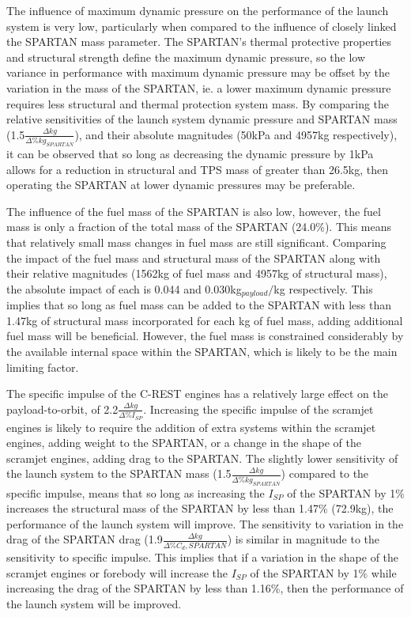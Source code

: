 The influence of maximum dynamic pressure on the performance of the launch system is very low, particularly when compared to the influence of closely linked the SPARTAN mass parameter. The SPARTAN's thermal protective properties and structural strength define the maximum dynamic pressure, so the low variance in performance with maximum dynamic pressure may be offset by the variation in the mass of the SPARTAN, ie. a lower maximum dynamic pressure requires less structural and thermal protection system mass.
 By comparing the relative sensitivities of the launch system dynamic pressure and SPARTAN mass (1.5$\frac{\Delta kg}{\Delta\%kg_{SPARTAN}}$), and their absolute magnitudes (50kPa and 4957kg respectively), it can be observed that so long as decreasing the dynamic pressure by 1kPa allows for a reduction in structural and TPS mass of greater than 26.5kg, then operating the SPARTAN at lower dynamic pressures may be preferable. 

The influence of the fuel mass of the SPARTAN is also low, however, the fuel mass is only a fraction of the total mass of the SPARTAN (24.0\%). This means that relatively small mass changes in fuel mass are still significant. Comparing the impact of the fuel mass and structural mass of the SPARTAN along with their relative magnitudes (1562kg of fuel mass and 4957kg of structural mass), the absolute impact of each is 0.044 and 0.030kg$_{payload}/$kg respectively. This implies that so long as fuel mass can be added to the SPARTAN with less than 1.47kg of structural mass incorporated for each kg of fuel mass, adding additional fuel mass will be beneficial. However, the fuel mass is constrained considerably by the available internal space within the SPARTAN, which is likely to be the main limiting factor.

The specific impulse of the C-REST engines has a relatively large effect on the payload-to-orbit, of 2.2$\frac{\Delta kg}{\Delta\%I_{SP}}$. Increasing the specific impulse of the scramjet engines is likely to require the addition of extra systems within the scramjet engines, adding weight to the SPARTAN, or a change in the shape of the scramjet engines, adding drag to the SPARTAN. 
The slightly lower sensitivity of the launch system to the SPARTAN mass (1.5$\frac{\Delta kg}{\Delta\%kg_{SPARTAN}}$) compared to the specific impulse, means that so long as increasing the $I_{SP}$ of the SPARTAN by 1\% increases the structural mass of the SPARTAN by less than 1.47\% (72.9kg), the performance of the launch system will improve. 
The sensitivity to variation in the drag of the SPARTAN drag (1.9$\frac{\Delta kg}{\Delta\%C_d,{SPARTAN}}$) is similar in magnitude to the sensitivity to specific impulse. 
This implies that if a variation in the shape of the scramjet engines or forebody will increase the $I_{SP}$ of the SPARTAN by 1\% while increasing the drag of the SPARTAN by less than 1.16\%, then the performance of the launch system will be improved. 

